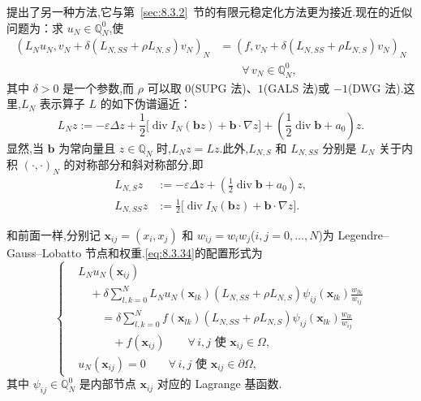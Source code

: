 提出了另一种方法,它与第~\ref{sec:8.3.2}~节的有限元稳定化方法更为接近.现在的近似问题为：求 \(u_N\in\mathbb Q_N^0\),使
\begin{equation}\label{eq:8.3.34}
  \begin{aligned}
    (L_Nu_N,v_N+\delta(L_{N,SS}+\rho L_{N,S})v_N)_N
      &=(f,v_N+\delta(L_{N,SS}+\rho L_{N,S})v_N)_N\\
      &\qquad\forall\,v_N\in\mathbb Q_N^0,
  \end{aligned}
\end{equation}
其中 \(\delta>0\) 是一个参数,而 \(\rho\) 可以取 \(0\)(SUPG 法)、\(1\)(GALS 法)或 \(-1\)(DWG 法).这里,\(L_N\) 表示算子 \(L\) 的如下伪谱逼近：
\begin{equation}\label{eq:8.3.35}
  L_Nz:=-\varepsilon\Delta z
    +\frac12\bigl[\operatorname{div}I_N(\boldsymbol{b}z)+\boldsymbol{b}\cdot\nabla z\bigr]
    +\left(\frac12\operatorname{div}\boldsymbol{b}+a_0\right)z.
\end{equation}
显然,当 \(\boldsymbol{b}\) 为常向量且 \(z\in\mathbb Q_N\) 时,\(L_Nz=Lz\).此外,\(L_{N,S}\) 和 \(L_{N,SS}\) 分别是 \(L_N\) 关于内积 \((\cdot,\cdot)_N\) 的对称部分和斜对称部分,即
\begin{align}
  L_{N,S}z&:=-\varepsilon\Delta z+
      \left(\frac12\operatorname{div}\boldsymbol{b}+a_0\right)z,\label{eq:8.3.36}\\
  L_{N,SS}z&:=\frac12\bigl[\operatorname{div}I_N(\boldsymbol{b}z)
                                 +\boldsymbol{b}\cdot\nabla z\bigr].\label{eq:8.3.37}
\end{align}

和前面一样,分别记 \(\boldsymbol{x}_{ij}=(x_i,x_j)\) 和 \(w_{ij}=w_iw_j\)(\(i,j=0,\ldots,N\))为 Legendre--Gauss--Lobatto 节点和权重.\eqref{eq:8.3.34}的配置形式为
\begin{equation}\label{eq:8.3.38}
  \left\{
  \begin{aligned}
    &L_Nu_N(\boldsymbol{x}_{ij})\\
    &\quad+\delta\sum_{l,k=0}^N L_Nu_N(\boldsymbol{x}_{lk})
         (L_{N,SS}+\rho L_{N,S})\psi_{ij}(\boldsymbol{x}_{lk})\frac{w_{lk}}{w_{ij}}\\
    &\qquad=\delta\sum_{l,k=0}^N f(\boldsymbol{x}_{lk})
         (L_{N,SS}+\rho L_{N,S})\psi_{ij}(\boldsymbol{x}_{lk})\frac{w_{lk}}{w_{ij}}\\
    &\qquad\quad+f(\boldsymbol{x}_{ij})\qquad\forall\,i,j\text{ 使 }\boldsymbol{x}_{ij}\in\Omega,\\
    &u_N(\boldsymbol{x}_{ij})=0\qquad\forall\,i,j\text{ 使 }\boldsymbol{x}_{ij}\in\partial\Omega,
  \end{aligned}
  \right.
\end{equation}
其中 \(\psi_{ij}\in\mathbb Q_N^0\) 是内部节点 \(\boldsymbol{x}_{ij}\) 对应的 Lagrange 基函数.

